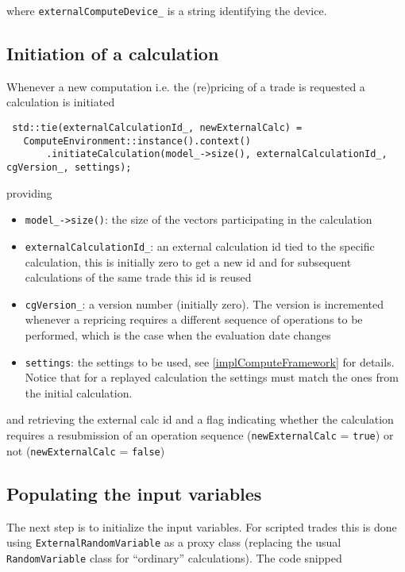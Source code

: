\documentclass[12pt, a4paper]{article}
\begin{document}
where \verb+externalComputeDevice_+ is a string identifying the device.

\subsection{Initiation of a calculation}

Whenever a new computation i.e. the (re)pricing of a trade is requested a calculation is initiated

\begin{verbatim}
 std::tie(externalCalculationId_, newExternalCalc) =
   ComputeEnvironment::instance().context()
       .initiateCalculation(model_->size(), externalCalculationId_, cgVersion_, settings);
\end{verbatim}

providing

\begin{itemize}
\item \verb+model_->size()+: the size of the vectors participating in the calculation
\item \verb+externalCalculationId_+: an external calculation id tied to the specific calculation, this is initially zero
  to get a new id and for subsequent calculations of the same trade this id is reused
\item \verb+cgVersion_+: a version number (initially zero). The version is incremented whenever a repricing requires a
  different sequence of operations to be performed, which is the case when the evaluation date changes
\item \verb+settings+: the settings to be used, see \ref{implComputeFramework} for details. Notice that for a replayed
  calculation the settings must match the ones from the initial calculation.
\end{itemize}

and retrieving the external calc id and a flag indicating whether the calculation requires a resubmission of an
operation sequence (\verb+newExternalCalc+ = \verb+true+) or not (\verb+newExternalCalc+ = \verb+false+)

\subsection{Populating the input variables}

The next step is to initialize the input variables. For scripted trades this is done using \verb+ExternalRandomVariable+
as a proxy class (replacing the usual \verb+RandomVariable+ class for ``ordinary'' calculations). The code snipped
\end{document}
